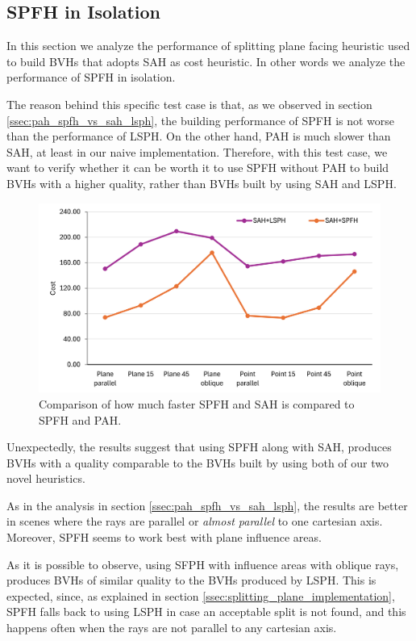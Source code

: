\documentclass{PoliMi_MasterThesis}
\begin{document}
\subsection{SPFH in Isolation} \label{ssec:spfh_in_isolation}
In this section we analyze the performance of splitting plane facing heuristic used to build BVHs that adopts SAH as cost heuristic. In other words we analyze the performance of SPFH in isolation.

The reason behind this specific test case is that, as we observed in section \ref{ssec:pah_spfh_vs_sah_lsph}, the building performance of SPFH is not worse than the performance of LSPH. On the other hand, PAH is much slower than SAH, at least in our naive implementation. Therefore, with this test case, we want to verify whether it can be worth it to use SPFH without PAH to build BVHs with a higher quality, rather than BVHs built by using SAH and LSPH.

\begin{figure}[H] 
	\centering
	\includegraphics[width=\textwidth]{Images/spfh_isolation.png}
	\caption{Comparison of how much faster SPFH and SAH is compared to SPFH and PAH.}
	\label{fig:spfh_isolation}
\end{figure}

Unexpectedly, the results suggest that using SPFH along with SAH, produces BVHs with a quality comparable to the BVHs built by using both of our two novel heuristics. 

As in the analysis in section \ref{ssec:pah_spfh_vs_sah_lsph}, the results are better in scenes where the rays are parallel or \textit{almost parallel} to one cartesian axis. Moreover, SPFH seems to work best with plane influence areas.

As it is possible to observe, using SFPH with influence areas with oblique rays, produces BVHs of similar quality to the BVHs produced by LSPH. This is expected, since, as explained in section \ref{ssec:splitting_plane_implementation}, SPFH falls back to using LSPH in case an acceptable split is not found, and this happens often when the rays are not parallel to any cartesian axis.
\end{document}
